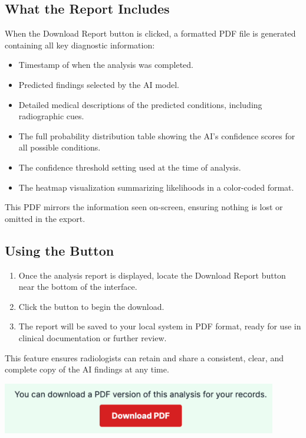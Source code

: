 \documentclass[12pt]{article}
\begin{document}
\subsection{What the Report Includes}

When the Download Report button is clicked, a formatted PDF file is generated containing all key diagnostic information:

\begin{itemize}
    \item Timestamp of when the analysis was completed.
    \item Predicted findings selected by the AI model.
    \item Detailed medical descriptions of the predicted conditions, including radiographic cues.
    \item The full probability distribution table showing the AI's confidence scores for all possible conditions.
    \item The confidence threshold setting used at the time of analysis.
    \item The heatmap visualization summarizing likelihoods in a color-coded format.
\end{itemize}

This PDF mirrors the information seen on-screen, ensuring nothing is lost or omitted in the export.

\subsection{Using the Button}

\begin{enumerate}
    \item Once the analysis report is displayed, locate the Download Report button near the bottom of the interface.
    \item Click the button to begin the download.
    \item The report will be saved to your local system in PDF format, ready for use in clinical documentation or further review.
\end{enumerate}

This feature ensures radiologists can retain and share a consistent, clear, and complete copy of the AI findings at any time.

\begin{center}
    \includegraphics[width=0.9\textwidth]{scan7.png}
\end{center}
\end{document}
